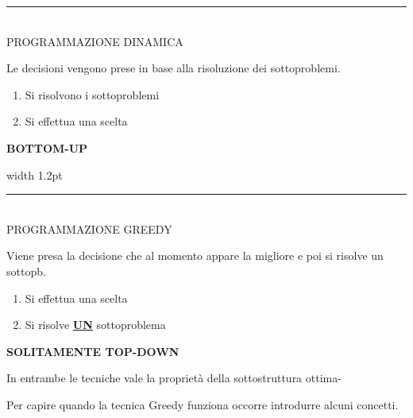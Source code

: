 \begin{minipage}[t]{0.47\textwidth}
  \rule{\linewidth}{1.2pt}\\[0.8em]
  
  \centering
  {PROGRAMMAZIONE DINAMICA}\\[1.4em]
  
  \raggedright
  Le decisioni vengono prese in base alla risoluzione dei sottoproblemi.\\[1.4em]
  
  \begin{enumerate}
    \item Si risolvono i sottoproblemi
    \item Si effettua una scelta
  \end{enumerate}

  \vspace{1.8em}
  \begin{center}
    \textbf{BOTTOM-UP}
  \end{center}
\end{minipage}%
\hfill
\vrule width 1.2pt
\hfill
\begin{minipage}[t]{0.47\textwidth}
  \rule{\linewidth}{1.2pt}\\[0.8em]
  
  \centering
  PROGRAMMAZIONE GREEDY\\[1.4em]
  
  \raggedright
  Viene presa la decisione che al momento appare la migliore e poi si risolve un sottopb.\\[1.4em]
  
  \begin{enumerate}
    \item Si effettua una scelta
    \item Si risolve \underline{\textbf{UN}} sottoproblema
  \end{enumerate}

  \vspace{1.8em}
    \begin{center}
        \textbf{SOLITAMENTE TOP-DOWN}    
    \end{center}
\end{minipage}

In entrambe le tecniche vale la proprietà della sottostruttura ottima-

Per capire quando la tecnica Greedy funziona occorre introdurre alcuni concetti.

